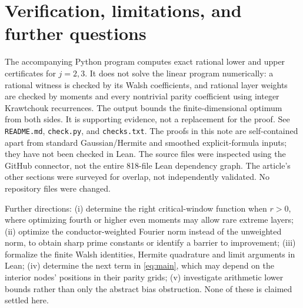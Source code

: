 \documentclass[11pt]{article}
\theoremstyle{remark}\newtheorem{remark}[theorem]{Remark}
\begin{document}
\section{Verification, limitations, and further questions}
The accompanying Python program computes exact rational lower and upper certificates for $j=2,3$. It does not solve the linear program numerically: a rational witness is checked by its Walsh coefficients, and rational layer weights are checked by moments and every nontrivial parity coefficient using integer Krawtchouk recurrences. The output bounds the finite-dimensional optimum from both sides. It is supporting evidence, not a replacement for the proof. See \texttt{README.md}, \texttt{check.py}, and \texttt{checks.txt}. The proofs in this note are self-contained apart from standard Gaussian/Hermite and smoothed explicit-formula inputs; they have not been checked in Lean. The source files were inspected using the GitHub connector, not the entire 818-file Lean dependency graph. The article's other sections were surveyed for overlap, not independently validated. No repository files were changed.

Further directions: (i) determine the right critical-window function when $r>0$, where optimizing fourth or higher even moments may allow rare extreme layers; (ii) optimize the conductor-weighted Fourier norm instead of the unweighted norm, to obtain sharp prime constants or identify a barrier to improvement; (iii) formalize the finite Walsh identities, Hermite quadrature and limit arguments in Lean; (iv) determine the next term in \eqref{eq:main}, which may depend on the interior nodes' positions in their parity grids; (v) investigate arithmetic lower bounds rather than only the abstract bias obstruction. None of these is claimed settled here.
\end{document}
